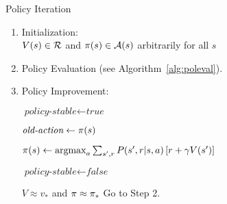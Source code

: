 
\begin{algorithm}
\caption{Policy Iteration}
\label{alg:politer}

\begin{enumerate}[topsep=0pt]

	\item Initialization: \\
		$V(s) \in \mathcal{R}$
		and
		$\pi(s) \in \mathcal{A}(s)$ arbitrarily for all $s$

	\item Policy Evaluation (see Algorithm~\ref{alg:poleval}).


	\item Policy Improvement:
		\begin{algorithmic}[1]
			\State $\textit{policy-stable} \gets \textit{true}$


				\State $\textit{old-action} \gets \pi(s)$

				\State $\pi(s) \gets
					\operatorname*{argmax}_{a} \sum_{s',r} {
						P(s',r|s,a)\left[r+\gamma V(s')\right]
						}$

					\State $\textit{policy-stable} \gets \textit{false}$
				\EndIf

			\EndFor

				\State \Return $V \approx v_*$
					and $\pi \approx \pi_*$
			\Else
				\State Go to Step 2.
			\EndIf
		\end{algorithmic}

\end{enumerate}

\end{algorithm}
